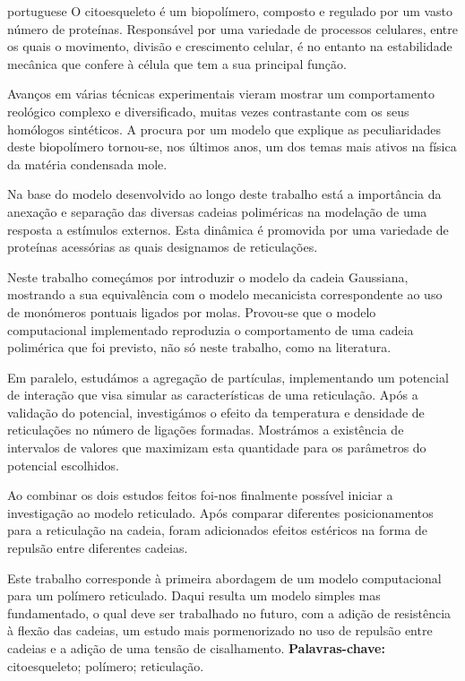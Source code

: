 \documentclass[../../main.tex]{subfiles}
\begin{document}
\begin{otherlanguage}
{portuguese}
%
    O citoesqueleto é um biopolímero, composto e regulado por um vasto número de proteínas. Responsável por uma variedade de processos celulares, entre os quais o movimento, divisão e crescimento celular, é no entanto na estabilidade mecânica que confere à célula que tem a sua principal função.

    Avanços em várias técnicas experimentais vieram mostrar um comportamento reológico complexo e diversificado, muitas vezes contrastante com os seus homólogos sintéticos. A procura por um modelo que explique as peculiaridades deste biopolímero tornou-se, nos últimos anos, um dos temas mais ativos na física da matéria condensada mole.

    Na base do modelo desenvolvido ao longo deste trabalho está a importância da anexação e separação das diversas cadeias poliméricas na modelação de uma resposta a estímulos externos. Esta dinâmica é promovida por uma variedade de proteínas acessórias as quais designamos de reticulações. 

    Neste trabalho começámos por introduzir o modelo da cadeia Gaussiana, mostrando a sua equivalência com o modelo mecanicista correspondente ao uso de monómeros pontuais ligados por molas. Provou-se que o modelo computacional implementado reproduzia o comportamento de uma cadeia polimérica que foi previsto, não só neste trabalho, como na literatura. 

    Em paralelo, estudámos a agregação de partículas, implementando um potencial de interação que visa simular as características de uma reticulação. Após a validação do potencial, investigámos o efeito da temperatura e densidade de reticulações no número de ligações formadas. Mostrámos a existência de intervalos de valores que maximizam esta quantidade para os parâmetros do potencial escolhidos.

    Ao combinar os dois estudos feitos foi-nos finalmente possível iniciar a investigação ao modelo reticulado. Após comparar diferentes posicionamentos para a reticulação na cadeia, foram adicionados efeitos estéricos na forma de repulsão entre diferentes cadeias. 

    Este trabalho corresponde à primeira abordagem de um modelo computacional para um polímero reticulado. Daqui resulta um modelo simples mas fundamentado, o qual deve ser trabalhado no futuro, com a adição de resistência à flexão das cadeias, um estudo mais pormenorizado no uso de repulsão entre cadeias e a adição de uma tensão de cisalhamento.
    \newline
    \newline
    \textbf{Palavras-chave:} citoesqueleto; polímero; reticulação.
%
\end{otherlanguage}
\end{document}
